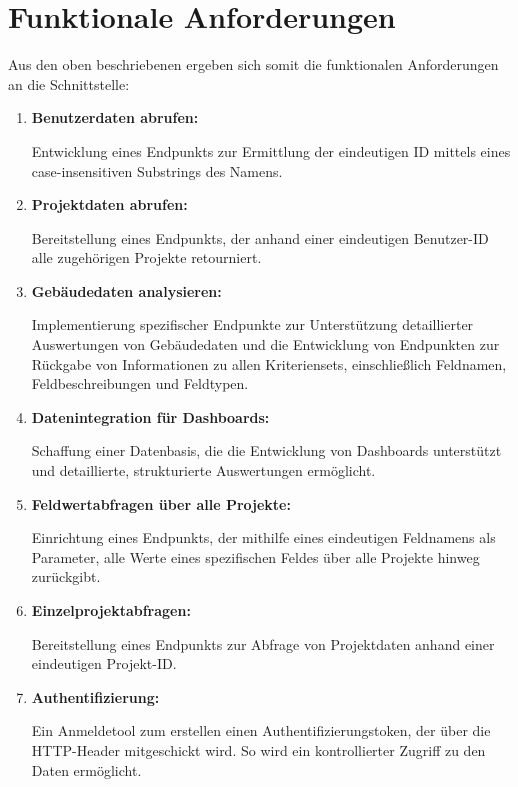 \documentclass[draft,final]{vutinfth} %
\begin{document}


\section{Funktionale Anforderungen}

Aus den oben beschriebenen  ergeben sich somit die funktionalen Anforderungen an die Schnittstelle:

\begin{enumerate}
	
	\item \textbf{Benutzerdaten abrufen:}
	
		 Entwicklung eines Endpunkts zur Ermittlung der eindeutigen ID mittels eines case-insensitiven Substrings des Namens.
	
	\item \textbf{Projektdaten abrufen:}
	
		Bereitstellung eines Endpunkts, der anhand einer eindeutigen Benutzer-ID alle zugehörigen Projekte retourniert.

	\item \textbf{Gebäudedaten analysieren:}
	
		Implementierung spezifischer Endpunkte zur Unterstützung detaillierter Auswertungen von Gebäudedaten und die Entwicklung von Endpunkten zur Rückgabe von Informationen zu allen Kriteriensets, einschließlich Feldnamen, Feldbeschreibungen und Feldtypen.

	\item \textbf{Datenintegration für Dashboards:}
	
		Schaffung einer Datenbasis, die die Entwicklung von Dashboards unterstützt und detaillierte, strukturierte Auswertungen ermöglicht.
	
	\item \textbf{Feldwertabfragen über alle Projekte:}
	
		Einrichtung eines Endpunkts, der mithilfe eines eindeutigen Feldnamens als Parameter, alle Werte eines spezifischen Feldes über alle Projekte hinweg zurückgibt.
	
	\item \textbf{Einzelprojektabfragen:}
	
		Bereitstellung eines Endpunkts zur Abfrage von Projektdaten anhand einer eindeutigen Projekt-ID.
	
	\item \textbf{Authentifizierung:}
	
		Ein Anmeldetool zum erstellen einen Authentifizierungstoken, der über die HTTP-Header mitgeschickt wird. 
		So wird ein kontrollierter Zugriff zu den Daten ermöglicht.
	
\end{enumerate}
\end{document}
